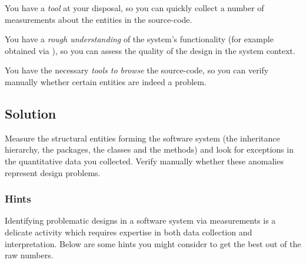\documentclass[a4paper,10pt,twoside]{book}
\begin{document}
\begin{bulletlist}
\item You have a \emph{ tool} at your disposal, so you can quickly collect a 
number of measurements about the entities in the source-code.

\item You have a \emph{rough understanding} of the system's functionality (for example 
obtained via ), so you can assess the quality of the 
design in the system context.

\item You have the necessary \emph{tools to browse} the source-code, so you can verify 
manually whether certain entities are indeed a problem.
\end{bulletlist}

\subsection*{Solution}

Measure the structural entities forming the software system (\ie the inheritance hierarchy, 
the packages, the classes and the methods) and look for exceptions in the quantitative data 
you collected. Verify manually whether these anomalies represent design problems.

\subsubsection*{Hints}

Identifying problematic designs in a software system via measurements is a delicate 
activity which requires expertise in both data collection and interpretation. Below are 
some hints you might consider to get the best out of the raw numbers.
\end{document}
